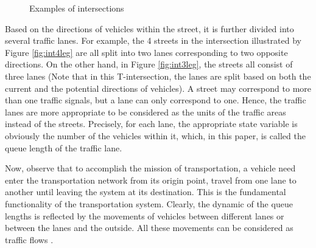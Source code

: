 \documentclass[preprint,authoryear,12pt]{elsarticle}
\begin{document}
\begin{figure}[ht]
  \centering
  \quad
  \caption{Examples of intersections}
\end{figure}

Based on the directions of vehicles within the street, it is further
divided into several traffic lanes. For example, the 4 streets in the
intersection illustrated by Figure \ref{fig:int4leg} are all split
into two lanes corresponding to two opposite directions. On the other
hand, in Figure \ref{fig:int3leg}, the streets all consist of three
lanes (Note that in this T-intersection, the lanes are split based on
both the current and the potential directions of vehicles). A street
may correspond to more than one traffic signals, but a lane can only
correspond to one. Hence, the traffic lanes are more appropriate to
be considered as the units of the traffic areas instead of the
streets.
Precisely, for each lane, the appropriate state variable is obviously
the number of the vehicles within it, which, in this paper, is called
the queue length of the traffic lane.

Now, observe that to accomplish the mission of transportation, a
vehicle need enter the transportation network from its origin point,
travel from one lane to another until leaving the system at its
destination. This is the fundamental functionality of the
transportation system. Clearly, the dynamic of the queue lengths is
reflected by the movements of vehicles between different lanes or
between the lanes and the outside. All these movements can be
considered as traffic flows \citep{nathan_h_gartner_revised_2005}.
\end{document}
